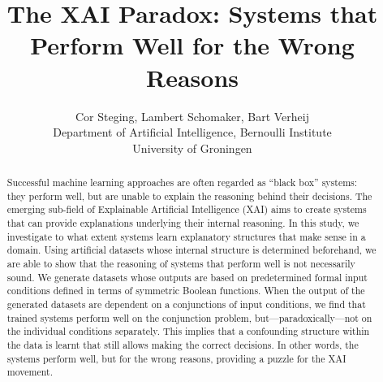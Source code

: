 \documentclass[letterpaper]{article} %
\begin{document}
%
\title{The XAI Paradox: Systems that Perform Well for the Wrong Reasons}
\author{Cor Steging, Lambert Schomaker, Bart Verheij\\
Department of Artificial Intelligence, Bernoulli Institute\\
University of Groningen\\
}
\maketitle
\begin{abstract}
Successful machine learning approaches are often regarded as ``black box'' systems: they perform well, but are unable to explain the reasoning behind their decisions. The emerging sub-field of Explainable Artificial Intelligence (XAI) aims to create systems that can provide explanations underlying their internal reasoning. In this study, we investigate to what extent systems learn explanatory structures that make sense in a domain. Using artificial datasets whose internal structure is determined beforehand, we are able to show that the reasoning of systems that perform well is not necessarily sound. We generate datasets whose outputs are based on predetermined formal input conditions defined in terms of symmetric Boolean functions. When the output of the generated datasets are dependent on a conjunctions of input conditions, we find that trained systems perform well on the conjunction problem, but---paradoxically---not on the individual conditions separately. This implies that a confounding
structure within the data is learnt that still allows making the correct decisions. In other words, the systems perform well, but for the wrong reasons, providing a puzzle for the XAI movement.

\end{abstract}
\end{document}
